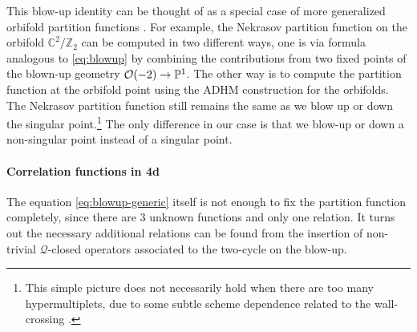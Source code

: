 \documentclass[letterpaper, 11pt]{article}
\def\IC{\mathbb{C}}
\def\IP{\mathbb{P}}
\def\IZ{\mathbb{Z}}
\def\CO{{\cal O}}
\begin{document}
This blow-up identity can be thought of as a special case of more generalized  orbifold partition functions \cite{Sasaki:2006vq,Bonelli:2012ny,Ito:2013kpa}. %
For example, the Nekrasov partition function on the orbifold $\IC^2/\IZ_2$ can be computed in two different ways, one is via formula analogous to \eqref{eq:blowup} by combining the contributions from two fixed points of the blown-up geometry $\CO(-2) \to \IP^1$. The other way is to compute the partition function at the orbifold point using the ADHM construction for the orbifolds. The Nekrasov partition function still remains the same as we blow up or down the singular point.\footnote{This simple picture does not necessarily hold when there are too many hypermultiplets, due to some subtle scheme dependence related to the wall-crossing \cite{Ito:2013kpa}.} 
The only difference in our case is that we blow-up or down a non-singular point instead of a singular point. 

\paragraph{Correlation functions in 4d}

The equation \eqref{eq:blowup-generic} itself is not enough to fix the partition function completely, since there are 3 unknown functions and only one relation. It turns out the necessary additional relations can be found from the insertion of non-trivial $\mathcal{Q}$-closed operators \cite{Nakajima:2003pg,Nakajima:2005fg} associated to the two-cycle on the blow-up. 
\end{document}
